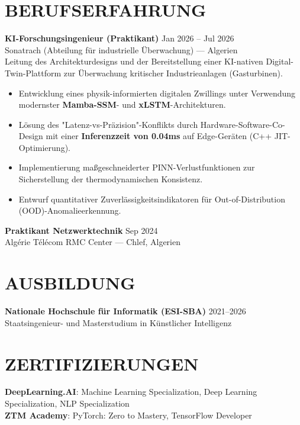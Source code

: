 \documentclass[a4paper,12pt]{article}
\begin{document}
\section{BERUFSERFAHRUNG}
\textbf{KI-Forschungsingenieur (Praktikant)} \hfill Jan 2026 -- Jul 2026 \\
Sonatrach (Abteilung für industrielle Überwachung) — Algerien \\
Leitung des Architekturdesigns und der Bereitstellung einer KI-nativen Digital-Twin-Plattform zur Überwachung kritischer Industrieanlagen (Gasturbinen).
\begin{itemize}
    \item Entwicklung eines physik-informierten digitalen Zwillings unter Verwendung modernster \textbf{Mamba-SSM}- und \textbf{xLSTM}-Architekturen.
    \item Lösung des "Latenz-vs-Präzision"-Konflikts durch Hardware-Software-Co-Design mit einer \textbf{Inferenzzeit von 0.04ms} auf Edge-Geräten (C++ JIT-Optimierung).
    \item Implementierung maßgeschneiderter PINN-Verlustfunktionen zur Sicherstellung der thermodynamischen Konsistenz.
    \item Entwurf quantitativer Zuverlässigkeitsindikatoren für Out-of-Distribution (OOD)-Anomalieerkennung.
\end{itemize}

\textbf{Praktikant Netzwerktechnik} \hfill Sep 2024 \\
Algérie Télécom RMC Center — Chlef, Algerien

\section{AUSBILDUNG}
\textbf{Nationale Hochschule für Informatik (ESI-SBA)} \hfill 2021--2026 \\
Staatsingenieur- und Masterstudium in Künstlicher Intelligenz

\section{ZERTIFIZIERUNGEN}
\textbf{DeepLearning.AI}: Machine Learning Specialization, Deep Learning Specialization, NLP Specialization \\
\textbf{ZTM Academy}: PyTorch: Zero to Mastery, TensorFlow Developer
\newpage
\end{document}
